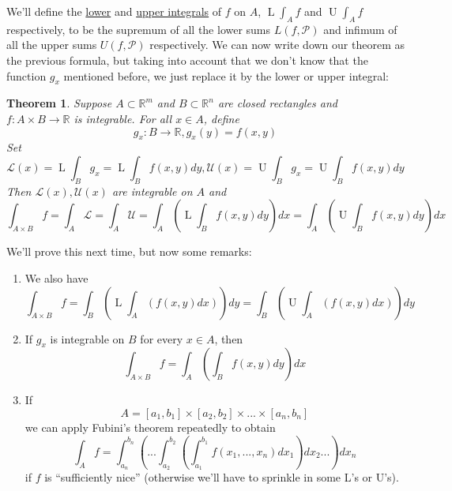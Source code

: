 \documentclass{article}
\newtheorem{theorem}{Theorem}
\newcommand{\reals}[0]{\mathbb{R}}
\newcommand{\mc}[1]{\mathcal{#1}}
\newcommand{\loint}[0]{\operatorname{L}\int}
\newcommand{\hiint}[0]{\operatorname{U}\int}
\begin{document}
We'll define the \underline{lower} and \underline{upper integrals} of \(f\) on \(A\), \(\loint_Af\) and \(\hiint_Af\) respectively, to be the supremum of all the lower sums \(L(f, \mc{P})\) and infimum of all the upper sums \(U(f, \mc{P})\) respectively. We can now write down our theorem as the previous formula, but taking into account that we don't know that the function \(g_x\) mentioned before, we just replace it by the lower or upper integral:
\begin{theorem}
  Suppose \(A \subset \reals^m\) and \(B \subset \reals^n\) are closed rectangles and \(f: A \times B \to \reals\) is integrable. For all \(x \in A\), define
  \[g_x: B \to \reals, g_x(y) = f(x, y)\]
  Set
  \[\mc{L}(x) = \loint_Bg_x = \loint_Bf(x, y)dy, \mc{U}(x) = \hiint_Bg_x = \hiint_Bf(x, y)dy\]
  Then \(\mc{L}(x), \mc{U}(x)\) are integrable on \(A\) and
  \[\int_{A \times B}f = \int_A\mc{L} = \int_A\mc{U} = \int_A\left(\loint_Bf(x, y)dy\right)dx = \int_A\left(\hiint_Bf(x, y)dy\right)dx\]
\end{theorem}
We'll prove this next time, but now some remarks:
\begin{enumerate}

  \item We also have
  \[\int_{A \times B}f = \int_B\left(\loint_A(f(x, y)dx)\right)dy = \int_B\left(\hiint_A(f(x, y)dx)\right)dy\]

  \item If \(g_x\) is integrable on \(B\) for every \(x \in A\), then
  \[\int_{A \times B}f = \int_A\left(\int_Bf(x, y)dy\right)dx\]

  \item If \[A = [a_1, b_1] \times [a_2, b_2] \times ... \times [a_n, b_n]\]
  we can apply Fubini's theorem repeatedly to obtain
  \[\int_Af = \int_{a_n}^{b_n} \left(... \int_{a_2}^{b_2}\left(\int_{a_1}^{b_1}f(x_1,...,x_n)dx_1\right)dx_2...\right) dx_n\]
  if \(f\) is ``sufficiently nice'' (otherwise we'll have to sprinkle in some L's or U's).

\end{enumerate}
\end{document}
